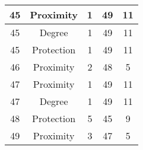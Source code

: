 \documentclass[results.tex]{subfiles}
\begin{document}
\begin{center}
\begin{tabular}{| c || c | c | c | c |}
            \hline
            45                      & Proximity                    & 1                      & 49                      & 11                   \\
            \hline
            45                      & Degree                       & 1                      & 49                      & 11                   \\
            \hline
            45                      & Protection                   & 1                      & 49                      & 11                   \\
            \hline
            46                      & Proximity                    & 2                      & 48                      & 5                    \\
            \hline
            47                      & Proximity                    & 1                      & 49                      & 11                   \\
            \hline
            47                      & Degree                       & 1                      & 49                      & 11                   \\
            \hline
            48                      & Protection                   & 5                      & 45                      & 9                    \\
            \hline
            49                      & Proximity                    & 3                      & 47                      & 5                    \\
            \hline
        \end{tabular}
    \end{center}
\end{document}
